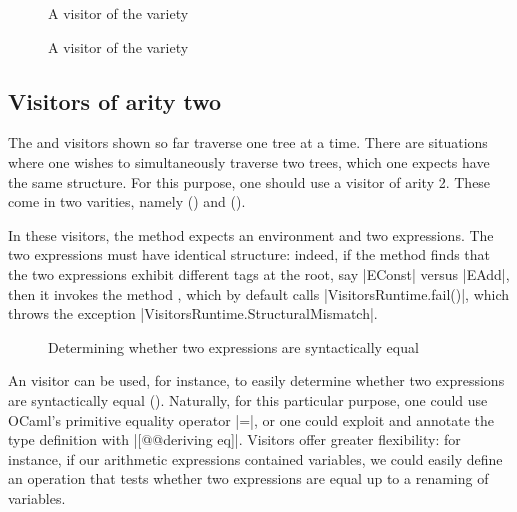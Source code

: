\documentclass[onecolumn,11pt,nocopyrightspace]{sigplanconf}
\begin{document}

\begin{figure}[p]
\vspace{-\baselineskip}
\caption{A visitor of the \itertwo variety}
\label{fig:expr02}
\end{figure}

\begin{figure}[p]
\vspace{-\baselineskip}
\caption{A visitor of the \maptwo variety}
\label{fig:expr03}
\end{figure}

\subsection{Visitors of arity two}
\label{sec:intro:aritytwo}

The \iter and \map visitors shown so far traverse one tree at a time. There
are situations where one wishes to simultaneously traverse two trees, which
one expects have the same structure. For this purpose, one should use a
visitor of arity 2. These come in two varities, namely \itertwo
() and \maptwo ().

In these visitors, the method  expects an environment and
two expressions. The two expressions must have identical structure: indeed, if
the method  finds that the two expressions exhibit
different tags at the root, say \oc|EConst| versus \oc|EAdd|, then it invokes
the method , which by default calls \oc|VisitorsRuntime.fail()|,
which throws the exception \oc|VisitorsRuntime.StructuralMismatch|.

\begin{figure}[t]
\caption{Determining whether two expressions are syntactically equal}
\label{fig:expr05}
\end{figure}

An \itertwo visitor can be used, for instance, to easily determine whether two
expressions are syntactically equal (). Naturally, for this
particular purpose, one could use OCaml's primitive equality operator \oc|=|,
or one could exploit \ppxderiving and annotate the type definition with
\oc|[@@deriving eq]|. Visitors offer greater flexibility: for instance, if our
arithmetic expressions contained variables, we could easily define an
operation that tests whether two expressions are equal up to a renaming of
variables.
\end{document}
